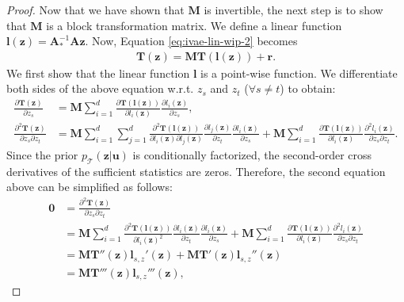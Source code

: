 \documentclass{article} %
\theoremstyle{plain}
\theoremstyle{definition}
\theoremstyle{remark}
\begin{document}
\begin{proof}
    Now that we have shown that $\mathbf{M}$ is invertible, the next step is to show that $\mathbf{M}$ is a block transformation matrix. We define a linear function $\mathbf{l}(\mathbf{z})=\mathbf{A}_{*}^{-1}\mathbf{A}\mathbf{z}$. Now, Equation \eqref{eq:ivae-lin-wip-2} becomes
    \begin{align}
        \mathbf{T}(\mathbf{z})=\mathbf{M}\mathbf{T}(\mathbf{l}(\mathbf{z})) +\mathbf{r}.\label{eq:identifiability}
    \end{align}
    We first show that the linear function $\mathbf{l}$ is a point-wise function. We differentiate both sides of the above equation w.r.t. $z_s$ and $z_t$ ($\forall s\not=t$) to obtain:
    \begin{align}
        \frac{\partial\mathbf{T}(\mathbf{z})}{\partial z_s} &= \mathbf{M}\sum_{i=1}^d\frac{\partial \mathbf{T}(\mathbf{l}(\mathbf{z}))}{\partial l_i(\mathbf{z})}\frac{\partial l_i(\mathbf{z})}{\partial z_s},\\
        \frac{\partial^2\mathbf{T}(\mathbf{z})}{\partial z_s\partial z_t} &= \mathbf{M}\sum_{i=1}^d \sum_{j=1}^d \frac{\partial^2 \mathbf{T}(\mathbf{l}(\mathbf{z}))}{\partial l_i(\mathbf{z}) \partial l_j(\mathbf{z})}\frac{\partial l_j(\mathbf{z})}{\partial z_t} \frac{\partial l_i(\mathbf{z})}{\partial z_s}  + \mathbf{M}\sum_{i=1}^d\frac{\partial \mathbf{T}(\mathbf{l}(\mathbf{z}))}{\partial l_i(\mathbf{z})}\frac{\partial^2 l_i(\mathbf{z})}{\partial z_s \partial z_t}.
    \end{align}
    Since the prior $p_{\mathcal{T}}(\mathbf{z}|\mathbf{u})$ is conditionally factorized, the second-order cross derivatives of the sufficient statistics are zeros. Therefore, the second equation above can be simplified as follows:
    \begin{align}
        \mathbf{0} &= \frac{\partial^2\mathbf{T}(\mathbf{z})}{\partial z_s\partial z_t}\\
        &= \mathbf{M}\sum_{i=1}^d \frac{\partial^2 \mathbf{T}(\mathbf{l}(\mathbf{z}))}{\partial l_i(\mathbf{z})^2}\frac{\partial l_i(\mathbf{z})}{\partial z_t} \frac{\partial l_i(\mathbf{z})}{\partial z_s}  + \mathbf{M}\sum_{i=1}^d\frac{\partial \mathbf{T}(\mathbf{l}(\mathbf{z}))}{\partial l_i(\mathbf{z})}\frac{\partial^2 l_i(\mathbf{z})}{\partial z_s \partial z_t}\\
        &= \mathbf{M}\mathbf{T}''(\mathbf{z})\mathbf{l}_{s,z}'(\mathbf{z})+\mathbf{M}\mathbf{T}'(\mathbf{z})\mathbf{l}_{s,z}''(\mathbf{z})\\
        &=\mathbf{M}\mathbf{T}'''(\mathbf{z})\mathbf{l}_{s,z}'''(\mathbf{z}),

\end{align}
\end{proof}
\end{document}
